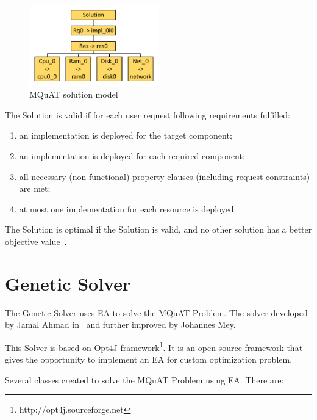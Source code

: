 \begin{figure}
	\centering
	\includegraphics[width=0.5\textwidth]{images/MQuATSolutionModel.pdf}
	\caption[MQuAT solution model]{MQuAT solution model}
	\label{fig:SolutionModel}
\end{figure}


The Solution is valid if for each user request following requirements fulfilled:
\begin{enumerate}
	\item an implementation is deployed for the target component;
	\item an implementation is deployed for each required component;
	\item all necessary (non-functional) property clauses (including request constraints) are met;
	\item at most one implementation for each resource is deployed.
\end{enumerate}

The Solution is optimal if the Solution is valid, and no other solution has a better objective value~\cite{gotz18}.



\section{Genetic Solver}\label{sec:GeneticSolver}
The Genetic Solver uses EA to solve the MQuAT Problem. The solver developed by Jamal Ahmad in~\cite{ahmad18} and further improved by Johannes Mey.

This Solver is based on Opt4J framework\footnote{http://opt4j.sourceforge.net}. It is an open-source framework that gives the opportunity to implement an EA for custom optimization problem.

Several classes created to solve the MQuAT Problem using EA. There are:

